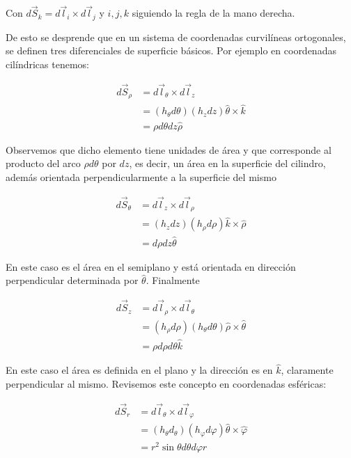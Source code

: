 Con $d \vec{S}_{k}=d \vec{l}_{i} \times d \vec{l}_{j}$ y $i, j, k$ siguiendo la regla de la mano derecha.

De esto se desprende que en un sistema de coordenadas curvilíneas ortogonales, se definen tres diferenciales de superficie básicos. Por ejemplo en coordenadas cilíndricas tenemos:

$$
\begin{aligned}
d \vec{S}_{\rho} & =d \vec{l}_{\theta} \times d \vec{l}_{z} \\
& =\left(h_{\theta} d \theta\right)\left(h_{z} d z\right) \hat{\theta} \times \widehat{k} \\
& =\rho d \theta d z \widehat{\rho}
\end{aligned}
$$

Observemos que dicho elemento tiene unidades de área y que corresponde al producto del arco $\rho d \theta$ por $d z$, es decir, un área en la superficie del cilindro, además orientada perpendicularmente a la superficie del mismo

$$
\begin{aligned}
d \vec{S}_{\theta} & =d \vec{l}_{z} \times d \vec{l}_{\rho} \\
& =\left(h_{z} d z\right)\left(h_{\rho} d \rho\right) \hat{k} \times \hat{\rho} \\
& =d \rho d z \hat{\theta}
\end{aligned}
$$

En este caso es el área en el semiplano y está orientada en dirección perpendicular determinada por $\hat{\theta}$. Finalmente

$$
\begin{aligned}
d \vec{S}_{z} & =d \vec{l}_{\rho} \times d \vec{l}_{\theta} \\
& =\left(h_{\rho} d \rho\right)\left(h_{\theta} d \theta\right) \hat{\rho} \times \widehat{\theta} \\
& =\rho d \rho d \theta \hat{k}
\end{aligned}
$$

En este caso el área es definida en el plano y la dirección es en $\hat{k}$, claramente perpendicular al mismo. Revisemos este concepto en coordenadas esféricas:

$$
\begin{aligned}
d \vec{S}_{r} & =d \vec{l}_{\theta} \times d \vec{l}_{\varphi} \\
& =\left(h_{\theta} d_{\theta}\right)\left(h_{\varphi} d \varphi\right) \widehat{\theta} \times \widehat{\varphi} \\
& =r^{2} \sin \theta d \theta d \varphi \widehat{r}
\end{aligned}
$$

